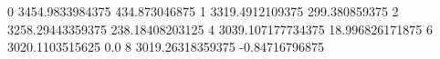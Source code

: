 0 3454.9833984375 434.873046875
1 3319.4912109375 299.380859375
2 3258.29443359375 238.18408203125
4 3039.107177734375 18.996826171875
6 3020.1103515625 0.0
8 3019.26318359375 -0.84716796875
